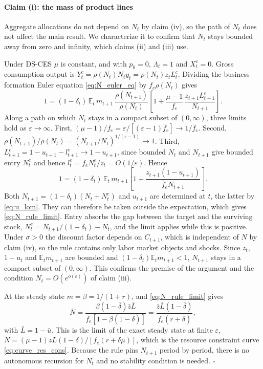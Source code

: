 \documentclass[authoryear, review, 12pt]{elsarticle}
\begin{document}
\paragraph{Claim (i): the mass of product lines}

Aggregate allocations do not depend on $N_t$ by claim (iv), so the path of $N_t$ does not
affect the main result. We characterize it to confirm that $N_t$ stays bounded away from
zero and infinity, which claims (ii) and (iii) use.

Under DS-CES $\mu$ is constant, and with $p_0=0$, $\Lambda_t=1$ and $X_t^c=0$. Gross
consumption output is $Y_t^c=\rho(N_t)N_ty_t=\rho(N_t)z_tL_t^c$. Dividing the business
formation Euler equation \eqref{eq:N_euler_eq} by $f_e\rho(N_t)$ gives
\[
	1=(1-\delta_t)\,\mathbb{E}_t\,m_{t+1}\,\frac{\rho(N_{t+1})}{\rho(N_t)}
	\left[1+\frac{\mu-1}{f_e}\,\frac{z_{t+1}L^c_{t+1}}{N_{t+1}}\right].
\]
Along a path on which $N_t$ stays in a compact subset of $(0,\infty)$, three limits hold
as $\varepsilon\to\infty$. First, $(\mu-1)/f_e=\varepsilon/[(\varepsilon-1)\bar{f}_e]\to1/\bar{f}_e$.
Second, $\rho(N_{t+1})/\rho(N_t)=(N_{t+1}/N_t)^{1/(\varepsilon-1)}\to1$. Third,
$L^c_{t+1}=1-u_{t+1}-l^e_{t+1}\to1-u_{t+1}$, since bounded $N_t$ and $N_{t+1}$ give
bounded entry $N^e_t$ and hence $l^e_t=f_eN^e_t/z_t=O(1/\varepsilon)$.
Hence
\[
	1=(1-\delta_t)\,\mathbb{E}_t\,m_{t+1}\left[1+\frac{z_{t+1}(1-u_{t+1})}{\bar{f}_eN_{t+1}}\right].
\]
Both $N_{t+1}=(1-\delta_t)(N_t+N^e_t)$ and $u_{t+1}$ are determined at $t$, the latter
by \eqref{eq:u_lom}. They can therefore be taken outside the expectation, which gives
\eqref{eq:N_rule_limit}. Entry absorbs the gap between the target and the surviving stock,
$N^e_t=N_{t+1}/(1-\delta_t)-N_t$, and the limit applies while this is positive. Under
$\sigma>0$ the discount factor depends on $C_{t+1}$, which is independent of $N$ by claim
(iv), so the rule contains only labor market objects and shocks. Since $z_t$, $1-u_t$ and
$\mathbb{E}_tm_{t+1}$ are bounded and $(1-\delta_t)\mathbb{E}_tm_{t+1}<1$, $N_{t+1}$ stays
in a compact subset of $(0,\infty)$. This confirms the premise of the argument and the
condition $N_t=O(e^{o(\varepsilon)})$ of claim (iii).

At the steady state $m=\beta=1/(1+r)$, and \eqref{eq:N_rule_limit} gives
\[
	\bar{N}=\frac{\beta(1-\bar\delta)\bar{z}\bar{L}}{\bar{f}_e[1-\beta(1-\bar\delta)]}
	=\frac{\bar{z}\bar{L}(1-\bar\delta)}{\bar{f}_e(r+\bar\delta)},
\]
with $\bar{L}=1-\bar{u}$. This is the limit of the exact steady state at finite $\varepsilon$,
$N=(\mu-1)zL(1-\delta)/[f_e(r+\delta\mu)]$, which is the resource constraint curve
\eqref{eq:curve_res_cons}. Because the rule pins $N_{t+1}$ period by period, there is no
autonomous recursion for $N_t$ and no stability condition is needed. $\square$
\end{document}
